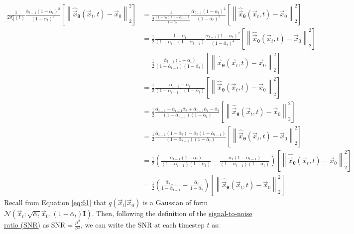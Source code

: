\begin{align}
{\frac{1}{2\sigma_q^2(t)}\frac{\bar\alpha_{t-1}(1-\alpha_t)^2}{(1 -\bar\alpha_{t})^2}\left[\left\lVert\hat \vec{x}_{\bm{\theta}}(\vec{x}_t, t) - \vec{x}_0\right\rVert_2^2\right]}
&= {\frac{1}{2\frac{(1 - \alpha_t)(1 - \bar\alpha_{t-1})}{1 -\bar\alpha_{t}}}\frac{\bar\alpha_{t-1}(1-\alpha_t)^2}{(1 -\bar\alpha_{t})^2}\left[\left\lVert\hat \vec{x}_{\bm{\theta}}(\vec{x}_t, t) - \vec{x}_0\right\rVert_2^2\right]}\\
&= {\frac{1}{2}\frac{1 -\bar\alpha_{t}}{(1 - \alpha_t)(1 - \bar\alpha_{t-1})}\frac{\bar\alpha_{t-1}(1-\alpha_t)^2}{(1 -\bar\alpha_{t})^2}\left[\left\lVert\hat \vec{x}_{\bm{\theta}}(\vec{x}_t, t) - \vec{x}_0\right\rVert_2^2\right]}\\
&= {\frac{1}{2}\frac{\bar\alpha_{t-1}(1-\alpha_t)}{(1 - \bar\alpha_{t-1})(1 -\bar\alpha_{t})}\left[\left\lVert\hat \vec{x}_{\bm{\theta}}(\vec{x}_t, t) - \vec{x}_0\right\rVert_2^2\right]}\\
&= {\frac{1}{2}\frac{\bar\alpha_{t-1}-\bar\alpha_t}{(1 - \bar\alpha_{t-1})(1 -\bar\alpha_{t})}\left[\left\lVert\hat \vec{x}_{\bm{\theta}}(\vec{x}_t, t) - \vec{x}_0\right\rVert_2^2\right]}\\
&= {\frac{1}{2}\frac{\bar\alpha_{t-1} - \bar\alpha_{t-1}\bar\alpha_t + \bar\alpha_{t-1}\bar\alpha_t-\bar\alpha_t}{(1 - \bar\alpha_{t-1})(1 -\bar\alpha_{t})}\left[\left\lVert\hat \vec{x}_{\bm{\theta}}(\vec{x}_t, t) - \vec{x}_0\right\rVert_2^2\right]}\\
&= {\frac{1}{2}\frac{\bar\alpha_{t-1}(1 - \bar\alpha_t) -\bar\alpha_t(1 - \bar\alpha_{t-1})}{(1 - \bar\alpha_{t-1})(1 -\bar\alpha_{t})}\left[\left\lVert\hat \vec{x}_{\bm{\theta}}(\vec{x}_t, t) - \vec{x}_0\right\rVert_2^2\right]}\\
&= {\frac{1}{2}\left(\frac{\bar\alpha_{t-1}(1 - \bar\alpha_t)}{(1 - \bar\alpha_{t-1})(1 -\bar\alpha_{t})} -\frac{\bar\alpha_t(1 - \bar\alpha_{t-1})}{(1 - \bar\alpha_{t-1})(1 -\bar\alpha_{t})}\right)\left[\left\lVert\hat \vec{x}_{\bm{\theta}}(\vec{x}_t, t) - \vec{x}_0\right\rVert_2^2\right]}\\
&= {\frac{1}{2}\left(\frac{\bar\alpha_{t-1}}{1 - \bar\alpha_{t-1}} -\frac{\bar\alpha_t}{1 -\bar\alpha_{t}}\right)\left[\left\lVert\hat \vec{x}_{\bm{\theta}}(\vec{x}_t, t) - \vec{x}_0\right\rVert_2^2\right]} \label{eq:102}
\end{align}
Recall from Equation \ref{eq:61} that $q(\vec{x}_t|\vec{x}_0)$ is a Gaussian of form $\mathcal{N}(\vec{x}_{t} ; \sqrt{\bar\alpha_t}\vec{x}_0, \left(1 - \bar\alpha_t\right)\textbf{I})$.  Then, following the definition of the \href{https://en.wikipedia.org/wiki/Signal-to-noise_ratio#Alternate_definition}{signal-to-noise ratio (SNR)} as $\text{SNR} = \frac{\mu^2}{\sigma^2}$, we can write the SNR at each timestep $t$ as:
